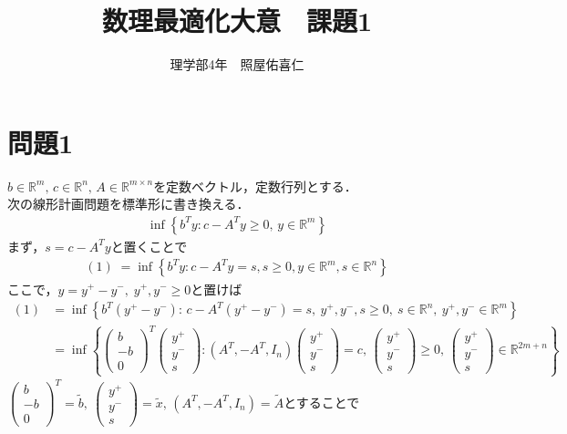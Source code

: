 \documentclass[a4j,uplatex]{jsarticle}
\title{数理最適化大意　課題1}
\author{理学部4年　照屋佑喜仁}
\theoremstyle{definition}
\begin{document}
\maketitle
\section{問題1}
$b\in \mathbb{R}^m,\, c \in \mathbb{R}^n,\, A\in\mathbb{R}^{m\times n}$を定数ベクトル，定数行列とする．\\
次の線形計画問題を標準形に書き換える．
\begin{align*}
    \inf \left\{b^T y: c-A^Ty \geq  0 ,\,y \in \mathbb{R}^m\right\}\tag{1}
\end{align*}
まず，$s=c-A^Ty$と置くことで
\begin{align*}
    (1) \; = \inf\left\{ b^Ty:c-A^Ty=s,s\geq 0,y\in\mathbb{R}^m,s\in\mathbb{R}^n \right\}
\end{align*}
ここで，$y=y^+-y^-,\; y^+,y^-\geq 0$と置けば
\begin{align*}
    (1) & =\inf \left\{ b^T(y^+-y^-):\, c-A^T(y^+-y^-)=s,\: y^+,y^-,s\geq 0,\: s\in\mathbb{R}^n,\: y^+,y^-\in\mathbb{R}^m \right\} \\
        & =\inf \left\{ \left(\begin{matrix}
                                      b \\-b\\0
                                  \end{matrix}\right)^T
    \left(
    \begin{matrix}
            y^+ \\y^-\\s
        \end{matrix}
    \right)
    :(A^T,-A^T,I_n)
    \left(
    \begin{matrix}
            y^+ \\y^-\\s
        \end{matrix}
    \right)
    =c,\,
    \left(
    \begin{matrix}
            y^+ \\y^-\\s
        \end{matrix}
    \right)\geq 0, \,     \left(
    \begin{matrix}
            y^+ \\y^-\\s
        \end{matrix}
    \right)\in \mathbb{R}^{2m+n}
    \right\}
\end{align*}
$\left(\begin{matrix}
            b \\-b\\0
        \end{matrix}\right)^T=\tilde{b},\:     \left(
    \begin{matrix}
            y^+ \\y^-\\s
        \end{matrix}
    \right)=\tilde{x},\,(A^T,-A^T,I_n)=\tilde{A}$とすることで
\end{document}
